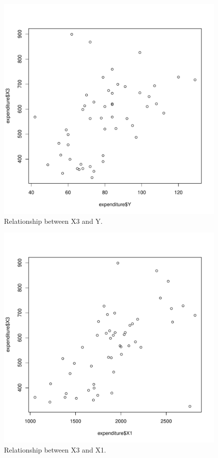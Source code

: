 \documentclass[12pt,letterpaper]{article}
\begin{document}
\begin{itemize}
\begin{figure}[hbtp!]\centering
	\caption{\footnotesize Relationship between X3 and Y.}
	\label{fig:plot_10}
	\includegraphics[width=.75\textwidth]{plot_X3_Y.pdf}
\end{figure}

\begin{figure}[hbtp!]\centering
	\caption{\footnotesize Relationship between X3 and X1.}
	\label{fig:plot_11}
	\includegraphics[width=.75\textwidth]{plot_X3_X1.pdf}
\end{figure}


\end{itemize}
\end{document}
